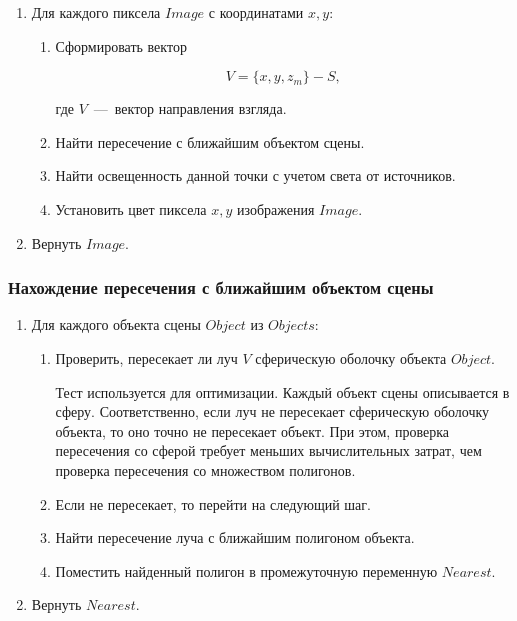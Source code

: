 \begin{enumerate}
	\item Для каждого пиксела $Image$ с координатами $x, y$:
	\begin{enumerate}
		\item Сформировать вектор 
		
		\begin{equation}
			V = \{x, y, z_m\} - S,
		\end{equation}
		
		где $V$~---~вектор направления взгляда.
		
		\item Найти пересечение с ближайшим объектом сцены.
		\item Найти освещенность данной точки с учетом света от источников.
		\item Установить цвет пиксела $x, y$ изображения $Image$.
	\end{enumerate}
	\item Вернуть $Image$.
\end{enumerate}

\subsubsection{Нахождение пересечения с ближайшим объектом сцены}
\begin{enumerate}
	\item Для каждого объекта сцены $Object$ из $Objects$:
	\begin{enumerate}
		\item Проверить, пересекает ли луч $V$ сферическую оболочку объекта $Object$.
		
		Тест используется для оптимизации. Каждый объект сцены описывается в сферу. Соответственно, если луч не пересекает сферическую оболочку объекта, то оно точно не пересекает объект. При этом, проверка пересечения со сферой требует меньших вычислительных затрат, чем проверка пересечения со множеством полигонов.
		
		\item Если не пересекает, то перейти на следующий шаг.
		\item Найти пересечение луча с ближайшим полигоном объекта.
		\item Поместить найденный полигон в промежуточную переменную $Nearest$.
	\end{enumerate}
	\item Вернуть $Nearest$.
\end{enumerate}

